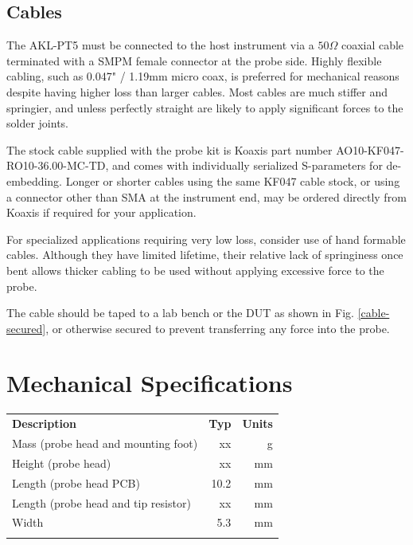 \documentclass[11pt]{article}
\newcommand{\thinhline}{\Xhline{1\arrayrulewidth}}
\newcommand{\thickhline}{\Xhline{2.5\arrayrulewidth}}
\begin{document}
\FloatBarrier
\subsection{Cables}

The AKL-PT5 must be connected to the host instrument via a $50 \Omega$ coaxial cable terminated with a SMPM female
connector at the probe side. Highly flexible cabling, such as 0.047" / 1.19mm micro coax, is preferred for mechanical
reasons despite having higher loss than larger cables. Most cables are much stiffer and springier, and
unless perfectly straight are likely to apply significant forces to the solder joints.

The stock cable supplied with the probe kit is Koaxis part number AO10-KF047-RO10-36.00-MC-TD,
and comes with individually serialized S-parameters for de-embedding. Longer or shorter cables using the same KF047
cable stock, or using a connector other than SMA at the instrument end, may be ordered directly from Koaxis if required
for your application.

For specialized applications requiring very low loss, consider use of hand formable cables. Although they have limited
lifetime, their relative lack of springiness once bent allows thicker cabling to be used without applying excessive
force to the probe.

The cable should be taped to a lab bench or the DUT as shown in Fig. \ref{cable-secured}, or otherwise secured to
prevent transferring any force into the probe.


\pagebreak
\section{Mechanical Specifications}

\begin{tabularx}{10cm}{Xrr}
\thickhline
\textbf{Description} & \textbf{Typ} & \textbf{Units} \\
\thickhline
Mass (probe head and mounting foot) & xx & g\\
\thinhline
Height (probe head) & xx & mm\\
\thinhline
Length (probe head PCB) & 10.2 & mm\\
\thinhline
Length (probe head and tip resistor) & xx & mm\\
\thinhline
Width & 5.3 & mm\\
\thickhline
\end{tabularx}
\end{document}
